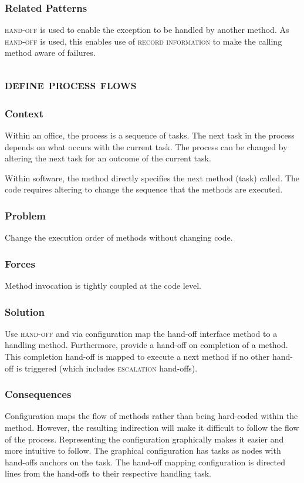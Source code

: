 \documentclass[prodmode]{style/acmlarge}
\begin{document}
\subsubsection*{Related Patterns} \textsc{hand-off} is used to enable the
exception to be handled by another method.  As \textsc{hand-off} is used, this
enables use of \textsc{record information} to make the calling method aware of
failures.



\subsection{\textsc{\textbf{define process flows}}}

\subsubsection*{Context} Within an office, the process is a sequence of tasks.
The next task in the process depends on what occurs with the current task.  The
process can be changed by altering the next task for an outcome of the current
task.

Within software, the method directly specifies the next method (task) called. 
The code requires altering to change the sequence that the methods are executed.

\subsubsection*{\textbf{Problem}} Change the execution order of methods without changing
code.

\subsubsection*{Forces} Method invocation is tightly coupled at the code level.

\subsubsection*{\textbf{Solution}} Use \textsc{hand-off} and via configuration map the
hand-off interface method to a handling method.  Furthermore, provide a hand-off
on completion of a method.  This completion hand-off is mapped to execute a next
method if no other hand-off is triggered (which includes \textsc{escalation}
hand-offs).

\subsubsection*{Consequences} Configuration maps the flow of methods rather than
being hard-coded within the method.  However, the resulting indirection will
make it difficult to follow the flow of the process.  Representing the
configuration graphically makes it easier and more intuitive to follow.  The
graphical configuration has tasks as nodes with hand-offs anchors on the task. 
The hand-off mapping configuration is directed lines from the hand-offs to their
respective handling task.
\end{document}
